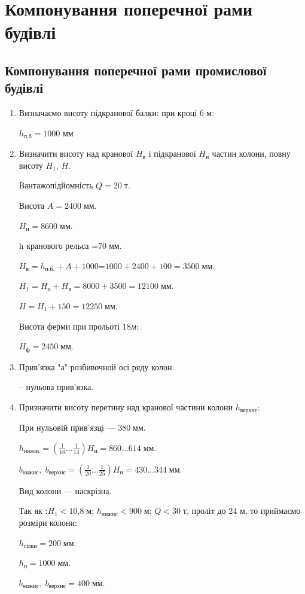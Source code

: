 \documentclass[a4paper,14pt]{article}
\author{}
\title{}
\date{\today}
\begin{document}
\section{Компонування поперечної рами будівлі}
\subsection{Компонування поперечної рами промислової будівлі}
\begin{enumerate}
\item Визначаємо висоту підкранової балки: при кроці 6 м:

$h_{\textit{п,б}}=1000$ мм

\item Визначити висоту над кранової $H_{\textit{в}}$ і підкранової $H_{\textit{н}}$ частин колони, повну висоту $H_{\textit{1}}$, $H$.

Вантажопідйомність $Q= 20\;{\textit{т}}$.

Висота $A=2400\;{\textit{мм}}$.

$H_{\textit{н}}=8600\;{\textit{мм}}$.

h кранового рельса =$70\;{\textit{мм}}$.

$H_{\textit{в}}=h_{\textit{п.б.}}+A+1000$=$1000+2400+100=3500\;\textit{мм}$.

$H_1=H_{\textit{н}}+H_{\textit{в}}=8000+3500=12100\;\textit{мм}$.

$H=H_1+150=12250\;\textit{мм}$.

Висота ферми при прольоті 18\;\textit{м}\;:

$H_{\textit{ф}}=2450\;\textit{мм}$.

\item Прив'язка "а" розбивочной осі ряду колон:

-- нульова прив'язка.

\item Призначити висоту перетину над кранової частини колони $h_{\textit{верхнє}}$:

При нульовій прив'язці --- $380\;{\textit{мм}}$.

$h_{\textit{нижнє}}=(\frac{1}{10}\ldots\frac{1}{14})H_\textit{н}=860\ldots614\;\textit{мм}$.

$b_{\textit{нижнє}},\;b_{\textit{верхнє}}=(\frac{1}{20}\ldots\frac{1}{25})H_\textit{н}=430\ldots344\;\textit{мм}$.

Вид колони --- наскрізна.

Так як :$H_1<\textit{10,8}\;\textit{м}$; $h_\textit{нижнє}<\textit{900}\;\textit{м}$; $Q<\textit{30}\;\textit{т}$, проліт до 24 м, то приймаємо розміри колони:

$h_{\textit{гілки}}=200\;\textit{мм}$.

$h_{\textit{н}}=1000\;\textit{мм}$.

$b_{\textit{нижнє}},\;b_{\textit{верхнє}}=400\;\textit{мм}$.
\end{enumerate}
\newpage
\end{document}
